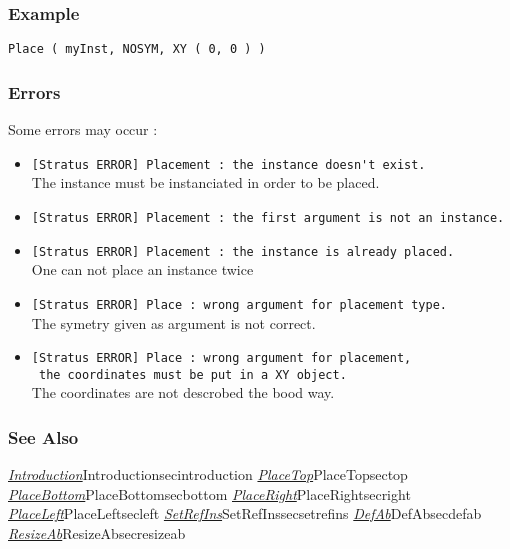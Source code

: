 \subsubsection{Example}

\begin{verbatim}
Place ( myInst, NOSYM, XY ( 0, 0 ) )
\end{verbatim}

\subsubsection{Errors}
    
Some errors may occur :
\begin{itemize}
    \item \verb-[Stratus ERROR] Placement : the instance doesn't exist.-\\The instance must be instanciated in order to be placed.
    \item \verb-[Stratus ERROR] Placement : the first argument is not an instance.-
    \item \verb-[Stratus ERROR] Placement : the instance is already placed.-\\One can not place an instance twice
    \item \verb-[Stratus ERROR] Place : wrong argument for placement type.-\\The symetry given as argument is not correct.
    \item \verb-[Stratus ERROR] Place : wrong argument for placement,-\\\verb- the coordinates must be put in a XY object.-\\The coordinates are not descrobed the bood way.
\end{itemize}

\begin{htmlonly}
        
\subsubsection{See Also}

\hyperref[ref]{\emph{Introduction}}{}{Introduction}{secintroduction}
\hyperref[ref]{\emph{PlaceTop}}{}{PlaceTop}{sectop}
\hyperref[ref]{\emph{PlaceBottom}}{}{PlaceBottom}{secbottom}
\hyperref[ref]{\emph{PlaceRight}}{}{PlaceRight}{secright}
\hyperref[ref]{\emph{PlaceLeft}}{}{PlaceLeft}{secleft}
\hyperref[ref]{\emph{SetRefIns}}{}{SetRefIns}{secsetrefins}
\hyperref[ref]{\emph{DefAb}}{}{DefAb}{secdefab}
\hyperref[ref]{\emph{ResizeAb}}{}{ResizeAb}{secresizeab}

\end{htmlonly}
